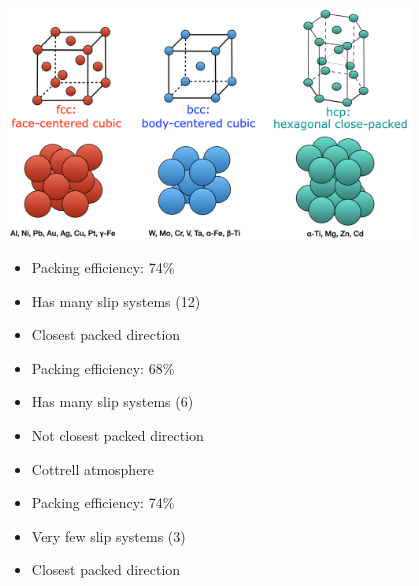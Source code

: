\documentclass{article}
\begin{document}
\begin{center}
  \includegraphics[width=0.8\textwidth]{media/fccbcchcp.png}
\end{center}

\begin{minipage}[t]{0.33\textwidth}
  \begin{itemize}
    \item Packing efficiency: 74\%
    \item Has many slip systems (12)
    \item Closest packed direction
  \end{itemize}
\end{minipage}%
\begin{minipage}[t]{0.33\textwidth}
  \begin{itemize}
    \item Packing efficiency: 68\%
    \item Has many slip systems (6)
    \item Not closest packed direction
    \item Cottrell atmosphere
  \end{itemize}
\end{minipage}%
\begin{minipage}[t]{0.33\textwidth}
  \vspace*{-0.45cm}
  \begin{itemize}
    \item Packing efficiency: 74\%
    \item Very few slip systems (3)
    \item Closest packed direction
  \end{itemize}
\end{minipage}

\newpage
\end{document}
